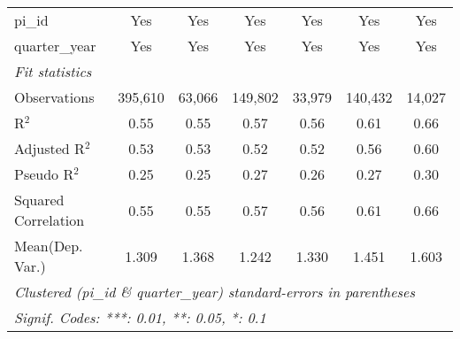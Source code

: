 \begin{tabular}{lcccccc}
   pi\_id                                                     & Yes           & Yes           & Yes           & Yes           & Yes           & Yes\\  
   quarter\_year                                              & Yes           & Yes           & Yes           & Yes           & Yes           & Yes\\  
   \midrule
   \emph{Fit statistics}\\
   Observations                                               & 395,610       & 63,066        & 149,802       & 33,979        & 140,432       & 14,027\\  
   R$^2$                                                      & 0.55          & 0.55          & 0.57          & 0.56          & 0.61          & 0.66\\  
   Adjusted R$^2$                                             & 0.53          & 0.53          & 0.52          & 0.52          & 0.56          & 0.60\\  
   Pseudo R$^2$                                               & 0.25          & 0.25          & 0.27          & 0.26          & 0.27          & 0.30\\  
   Squared Correlation                                        & 0.55          & 0.55          & 0.57          & 0.56          & 0.61          & 0.66\\  
Mean(Dep. Var.) & 1.309 & 1.368 & 1.242 & 1.330 & 1.451 & 1.603 \\
   \midrule \midrule
   \multicolumn{7}{l}{\emph{Clustered (pi\_id \& quarter\_year) standard-errors in parentheses}}\\
   \multicolumn{7}{l}{\emph{Signif. Codes: ***: 0.01, **: 0.05, *: 0.1}}\\
\end{tabular}
\par\endgroup
